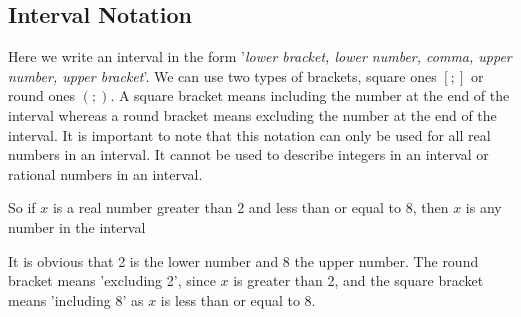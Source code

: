             \subsection{ Interval Notation}
            \nopagebreak
          \label{m39337*id236181}Here we write an interval in the form '\textsl{lower bracket, lower number, comma, upper number, upper bracket}'. We can use two types of brackets, square ones $\left[;\right]$ or round ones $\left(;\right)$. A square bracket means including the number at the end of the interval whereas a round bracket means excluding the number at the end of the interval. It is important to note that this notation can only be used for all real numbers in an interval. It cannot be used to describe integers in an interval or rational numbers in an interval.\par 
          \label{m39337*id236225}So if $x$ is a real number greater than 2 and less than or equal to 8, then $x$ is any number in the interval\par 
          \label{m39337*uid45}\nopagebreak\noindent{}\settowidth{\mymathboxwidth}{\begin{equation}
    \left(2;8\right]\tag{1.6}
      \end{equation}
    }
    \ifthenelse{\lengthtest{\mymathboxwidth < \columnwidth}}{%
    \begin{equation}
    \left(2;8\right]\tag{1.6}
      \end{equation}
    }{%
    \setlength{\mymathboxwidth}{\columnwidth}
      \addtolength{\mymathboxwidth}{-48pt}
    \par\vspace{12pt}\noindent\begin{minipage}{\columnwidth}
    \parbox[t]{\mymathboxwidth}{\large$
    \left(2;8\right]$}\hfill
    \parbox[t]{48pt}{\raggedleft 
    (1.6)}
    \end{minipage}\vspace{12pt}\par
    }%
          \label{m39337*id236274}It is obvious that 2 is the lower number and 8 the upper number. The round bracket means 'excluding 2', since $x$ is greater than 2, and the square bracket means 'including 8' as $x$ is less than or equal to 8.\par 
      \label{m39337*uid46}
